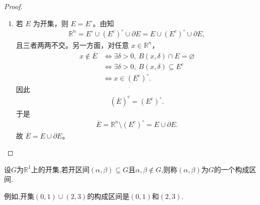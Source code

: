 \documentclass[../../main.tex]{subfiles}%
\begin{document}
\begin{proof}
\begin{enumerate}[(1)]
\item 若 \(E\) 为开集，则 \(E=E^\circ\)。由知
\begin{align*}
\mathbb{R}^n = E^\circ \cup (E^c)^\circ \cup \partial E = E \cup (E^c)^\circ \cup \partial E,
\end{align*}
且三者两两不交。另一方面，对任意 \(x\in\mathbb{R}^n\)，
\begin{align*}
x\notin \overline{E} &\iff \exists \delta>0,\ B(x,\delta)\cap E=\varnothing \\
&\iff \exists \delta>0,\ B(x,\delta)\subseteq E^c \\
&\iff x\in (E^c)^\circ.
\end{align*}
因此
\begin{align*}
(\overline{E})^c = (E^c)^\circ.
\end{align*}
于是
\begin{align*}
\overline{E} = \mathbb{R}^n \setminus (E^c)^\circ = E \cup \partial E.
\end{align*}
故 \(\overline{E}=E\cup\partial E\)。
\end{enumerate}
\end{proof}

\begin{definition}[构成区间]
设$G$为$\mathbb{R}^1$上的开集,若开区间$(\alpha,\beta)\subseteq G$且$\alpha,\beta \notin G$,则称$(\alpha,\beta)$为$G$的一个构成区间.
\end{definition}
\begin{note}
例如,开集$(0,1)\cup (2,3)$的构成区间是$(0,1)$和$(2,3)$.
\end{note}
\end{document}
